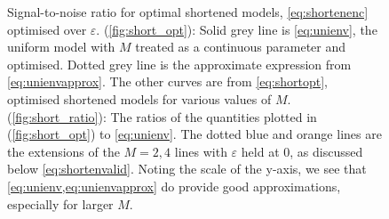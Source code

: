 \documentclass[12pt]{article}
\newenvironment{myenuma}{\begin{inparaenum}[(a)]}{\end{inparaenum}}
\begin{document}
\begin{figure}[ht]
\begin{center}
\begin{myenuma}
  \item\label{fig:short_opt}
  \item\label{fig:short_ratio}
\end{myenuma}
\caption[Signal-to-noise ratio for optimal shortened models]
{Signal-to-noise ratio for optimal shortened models, \cref{eq:shortenenc} optimised over \(\varepsilon\).
(\ref{fig:short_opt}): Solid grey line is \cref{eq:unienv}, the uniform model with \(M\) treated as a continuous parameter and optimised.
Dotted grey line is the approximate expression from \cref{eq:unienvapprox}.
The other curves are from \cref{eq:shortopt}, optimised shortened models for various values of \(M\).
(\ref{fig:short_ratio}): The ratios of the quantities plotted in (\ref{fig:short_opt}) to \cref{eq:unienv}.
The dotted blue and orange lines are the extensions of the \(M=2,4\) lines with \(\varepsilon\) held at 0, as discussed below \cref{eq:shortenvalid}.
Noting the scale of the y-axis, we see that \cref{eq:unienv,eq:unienvapprox} do provide good approximations, especially for larger \(M\).
\label{fig:shorten}}
\end{center}
\end{figure}
\end{document}
